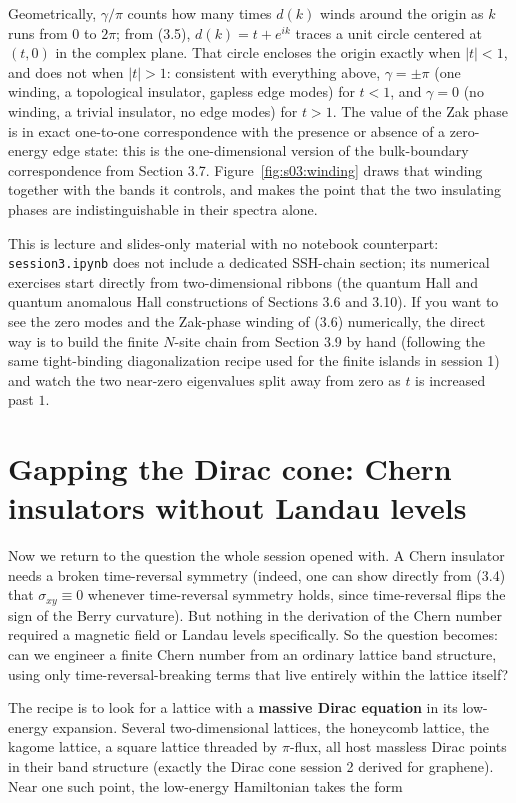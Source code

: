 Geometrically, $\gamma/\pi$ counts how many times $d(k)$ winds around the origin as $k$ runs from $0$
to $2\pi$; from (3.5), $d(k) = t + e^{ik}$ traces a unit circle centered at $(t,0)$ in the complex
plane. That circle encloses the origin exactly when $|t|<1$, and does not when $|t|>1$: consistent
with everything above, $\gamma = \pm\pi$ (one winding, a topological insulator, gapless edge modes)
for $t<1$, and $\gamma = 0$ (no winding, a trivial insulator, no edge modes) for $t>1$. The value of
the Zak phase is in exact one-to-one correspondence with the presence or absence of a zero-energy
edge state: this is the one-dimensional version of the bulk-boundary correspondence from Section 3.7.
Figure~\ref{fig:s03:winding} draws that winding together with the bands it controls, and makes the
point that the two insulating phases are indistinguishable in their spectra alone.



This is lecture and slides-only material with no notebook counterpart: \texttt{session3.ipynb} does not
include a dedicated SSH-chain section; its numerical exercises start directly from two-dimensional
ribbons (the quantum Hall and quantum anomalous Hall constructions of Sections 3.6 and 3.10). If you
want to see the zero modes and the Zak-phase winding of (3.6) numerically, the direct way is to build
the finite $N$-site chain from Section 3.9 by hand (following the same tight-binding diagonalization
recipe used for the finite islands in session 1) and watch the two near-zero eigenvalues split away
from zero as $t$ is increased past $1$.

\section{Gapping the Dirac cone: Chern insulators without Landau levels}

Now we return to the question the whole session opened with. A Chern insulator needs a broken
time-reversal symmetry (indeed, one can show directly from (3.4) that $\sigma_{xy}\equiv 0$ whenever
time-reversal symmetry holds, since time-reversal flips the sign of the Berry curvature). But nothing
in the derivation of the Chern number required a magnetic field or Landau levels specifically. So the
question becomes: can we engineer a finite Chern number from an ordinary lattice band structure,
using only time-reversal-breaking terms that live entirely within the lattice itself?

The recipe is to look for a lattice with a \textbf{massive Dirac equation} in its low-energy expansion.
Several two-dimensional lattices, the honeycomb lattice, the kagome lattice, a square lattice
threaded by $\pi$-flux, all host massless Dirac points in their band structure (exactly the Dirac
cone session 2 derived for graphene). Near one such point, the low-energy Hamiltonian takes the form

